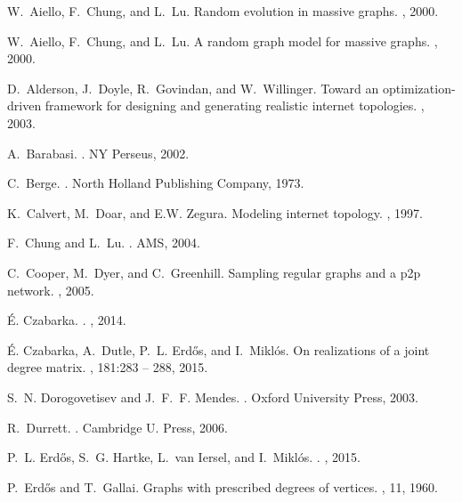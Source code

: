 \documentclass[12pt,a4paper]{article}
\theoremstyle{definition}
\theoremstyle{plain}
\begin{document}
\begin{thebibliography}{10}

W.~Aiello, F.~Chung, and L.~Lu.
\newblock Random evolution in massive graphs.
, 2000.

W.~Aiello, F.~Chung, and L.~Lu.
\newblock A random graph model for massive graphs.
, 2000.

D.~Alderson, J.~Doyle, R.~Govindan, and W.~Willinger.
\newblock Toward an optimization-driven framework for designing and generating
  realistic internet topologies.
, 2003.

A.~Barabasi.
.
\newblock NY Perseus, 2002.

C.~Berge.
.
\newblock North Holland Publishing Company, 1973.

K.~Calvert, M.~Doar, and E.W. Zegura.
\newblock Modeling internet topology.
, 1997.

F.~Chung and L.~Lu.
.
\newblock AMS, 2004.

C.~Cooper, M.~Dyer, and C.~Greenhill.
\newblock Sampling regular graphs and a p2p network.
, 2005.

\'{E}. Czabarka.
.
, 2014.

\'{E}. Czabarka, A.~Dutle, P.~L. Erd\H{o}s, and I.~Mikl\'{o}s.
\newblock On realizations of a joint degree matrix.
, 181:283 -- 288, 2015.

S.~N. Dorogovetisev and J.~F.~F. Mendes.
.
\newblock Oxford University Press, 2003.

R.~Durrett.
.
\newblock Cambridge U. Press, 2006.

P.~L. {Erd{\H o}s}, S.~G. {Hartke}, L.~{van Iersel}, and I.~{Mikl{\'o}s}.
.
, 2015.

P.~Erd\H{o}s and T.~Gallai.
\newblock Graphs with prescribed degrees of vertices.
, 11, 1960.


\end{thebibliography}
\end{document}
